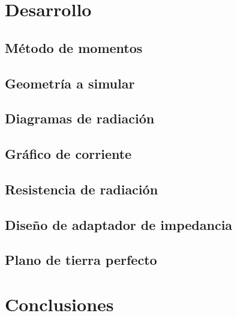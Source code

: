 \documentclass[10pt,a4paper]{article}
\begin{document}
		
	\setcounter{page}{1}
	\section{Desarrollo}
		
		\subsection{Método de momentos}
			
		\subsection{Geometría a simular}
			
		\subsection{Diagramas de radiación}
			
		\subsection{Gráfico de corriente}
			
		\subsection{Resistencia de radiación}
			
		\subsection{Diseño de adaptador de impedancia}
			
		\subsection{Plano de tierra perfecto}
					
	\pagebreak					
	\section{Conclusiones}
		
		
\end{document}
